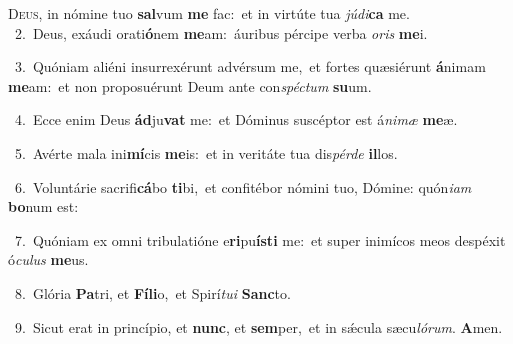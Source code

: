 \lettrine{\initial\textcolor{\initialcolor}{D}}{eus,} in nómine tuo \textbf{sal}\-vum \textbf{me} fac:~\star et in virtúte tua \textit{jú}\-\textit{di}\textbf{ca} me.\\
{\numbfont\textcolor{\numbcolor}{~2.}}~Deus, exáudi orati\-\textbf{ó}\-nem \textbf{me}\-am:~\star áuribus pércipe verba \textit{o}\-\textit{ris} \textbf{me}\-i.\par
{\numbfont\textcolor{\numbcolor}{~3.}}~Quóniam aliéni insurrexérunt advérsum me,~\dagger et fortes quæsiérunt \textbf{á}\-nimam \textbf{me}\-am:~\star et non proposuérunt Deum ante con\-\textit{spéc}\-\textit{tum} \textbf{su}\-um.\par
{\numbfont\textcolor{\numbcolor}{~4.}}~Ecce enim Deus \textbf{ád}\-ju\textbf{vat} me:~\star et Dóminus suscéptor est á\-\textit{ni}\-\textit{mæ} \textbf{me}\-æ.\par
{\numbfont\textcolor{\numbcolor}{~5.}}~Avérte mala ini\-\textbf{mí}\-cis \textbf{me}\-is:~\star et in veritáte tua dis\-\textit{pér}\-\textit{de} \textbf{il}\-los.\par
{\numbfont\textcolor{\numbcolor}{~6.}}~Voluntárie sacrifi\-\textbf{cá}\-bo \textbf{ti}\-bi,~\star et confitébor nómini tuo, Dómine: quón\-\textit{i}\-\textit{am} \textbf{bo}\-num est:\par
{\numbfont\textcolor{\numbcolor}{~7.}}~Quóniam ex omni tribulatióne e\-\textbf{ri}\-pu\-\textbf{ís}\-\textbf{ti} me:~\star et super inimícos meos despéxit ó\-\textit{cu}\-\textit{lus} \textbf{me}\-us.\par
{\numbfont\textcolor{\numbcolor}{~8.}}~Glória \textbf{Pa}\-tri, et \textbf{Fí}\-\textbf{li}o,~\star et Spirí\-\textit{tu}\-\textit{i} \textbf{Sanc}\-to.\par
{\numbfont\textcolor{\numbcolor}{~9.}}~Sicut erat in princípio, et \textbf{nunc}\-, et \textbf{sem}\-per,~\star et in sǽcula sæcu\-\textit{ló}\-\textit{rum}. \textbf{A}\-men.\par
